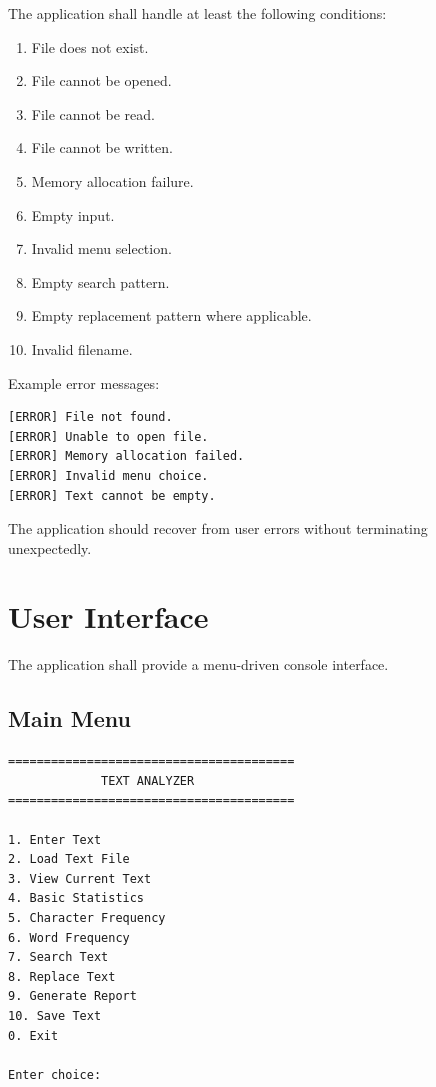 \documentclass[12pt,a4paper]{article}
\begin{document}
The application shall handle at least the following conditions:

\begin{enumerate}
    \item File does not exist.
    \item File cannot be opened.
    \item File cannot be read.
    \item File cannot be written.
    \item Memory allocation failure.
    \item Empty input.
    \item Invalid menu selection.
    \item Empty search pattern.
    \item Empty replacement pattern where applicable.
    \item Invalid filename.
\end{enumerate}

Example error messages:

\begin{verbatim}
[ERROR] File not found.
[ERROR] Unable to open file.
[ERROR] Memory allocation failed.
[ERROR] Invalid menu choice.
[ERROR] Text cannot be empty.
\end{verbatim}

The application should recover from user errors without terminating
unexpectedly.


\section{User Interface}

The application shall provide a menu-driven console interface.

\subsection{Main Menu}

\begin{verbatim}
========================================
             TEXT ANALYZER
========================================

1. Enter Text
2. Load Text File
3. View Current Text
4. Basic Statistics
5. Character Frequency
6. Word Frequency
7. Search Text
8. Replace Text
9. Generate Report
10. Save Text
0. Exit

Enter choice:
\end{verbatim}
\end{document}
